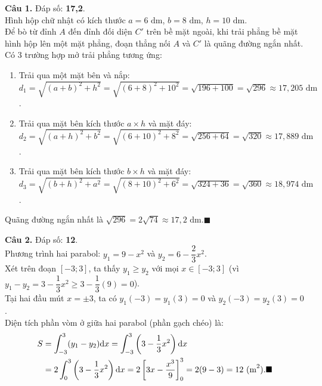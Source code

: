 \documentclass[12pt,a4paper]{article}
\begin{document}
\noindent\textbf{Câu 1.} Đáp số: \textbf{17,2}.\\
Hình hộp chữ nhật có kích thước $a = 6\text{ dm}$, $b = 8\text{ dm}$, $h = 10\text{ dm}$.\\
Để bò từ đỉnh $A$ đến đỉnh đối diện $C'$ trên bề mặt ngoài, khi trải phẳng bề mặt hình hộp lên một mặt phẳng, đoạn thẳng nối $A$ và $C'$ là quãng đường ngắn nhất.\\
Có 3 trường hợp mở trải phẳng tương ứng:
\begin{enumerate}[leftmargin=*]
    \item Trải qua một mặt bên và nắp:\\
    $d_1 = \sqrt{(a + b)^2 + h^2} = \sqrt{(6 + 8)^2 + 10^2} = \sqrt{196 + 100} = \sqrt{296} \approx 17{,}205\text{ dm}$.
    \item Trải qua mặt bên kích thước $a \times h$ và mặt đáy:\\
    $d_2 = \sqrt{(a + h)^2 + b^2} = \sqrt{(6 + 10)^2 + 8^2} = \sqrt{256 + 64} = \sqrt{320} \approx 17{,}889\text{ dm}$.
    \item Trải qua mặt bên kích thước $b \times h$ và mặt đáy:\\
    $d_3 = \sqrt{(b + h)^2 + a^2} = \sqrt{(8 + 10)^2 + 6^2} = \sqrt{324 + 36} = \sqrt{360} \approx 18{,}974\text{ dm}$.
\end{enumerate}
Quãng đường ngắn nhất là $\sqrt{296} = 2\sqrt{74} \approx 17{,}2\text{ dm}$.\hfill$\blacksquare$

\vspace{0.2cm}\noindent\textbf{Câu 2.} Đáp số: \textbf{12}.\\
Phương trình hai parabol: $y_1 = 9 - x^2$ và $y_2 = 6 - \dfrac{2}{3}x^2$.\\
Xét trên đoạn $[-3; 3]$, ta thấy $y_1 \ge y_2$ với mọi $x \in [-3; 3]$ (vì $y_1 - y_2 = 3 - \dfrac{1}{3}x^2 \ge 3 - \dfrac{1}{3}(9) = 0$).\\
Tại hai đầu mút $x = \pm 3$, ta có $y_1(-3) = y_1(3) = 0$ và $y_2(-3) = y_2(3) = 0$.\\
Diện tích phần vòm ở giữa hai parabol (phần gạch chéo) là:
\begin{align*}
    S &= \int_{-3}^3 (y_1 - y_2) \mathrm{d}x = \int_{-3}^3 \left(3 - \dfrac{1}{3}x^2\right) \mathrm{d}x \\
    &= 2 \int_0^3 \left(3 - \dfrac{1}{3}x^2\right) \mathrm{d}x = 2 \left[3x - \dfrac{x^3}{9}\right]_0^3 = 2(9 - 3) = 12\text{ (m}^2\text{)}.\hfill\blacksquare
\end{align*}
\end{document}
